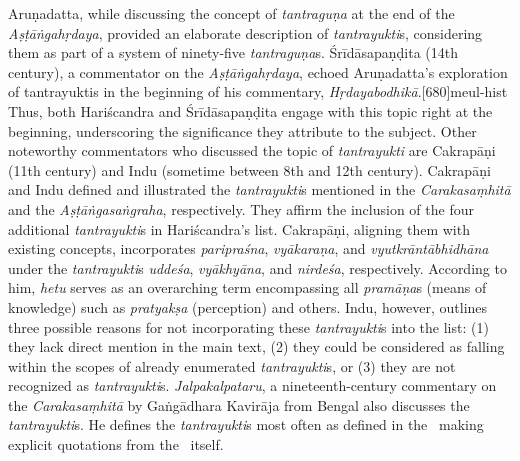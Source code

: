 Aruṇadatta, while discussing the concept of \emph{tantraguṇa} at the end of the \emph{Aṣṭāṅgahṛdaya}, provided an elaborate description of \emph{tantrayukti}s, considering them as part of a system of ninety-five \emph{tantraguṇa}s. Śrīdāsapaṇḍita (14th century), a commentator on the \emph{Aṣṭāṅgahṛdaya}, echoed Aruṇadatta's exploration of tantrayuktis in the beginning of his commentary, \emph{Hṛdayabodhikā}.[680]{meul-hist} Thus, both Hariścandra and Śrīdāsapaṇḍita engage with this topic right at the beginning, underscoring the significance they attribute to the subject. Other noteworthy commentators who discussed the topic of \emph{tantrayukti} are Cakrapāṇi (11th century) and Indu (sometime between 8th and 12th century). Cakrapāṇi and Indu defined and illustrated the \emph{tantrayukti}s mentioned in the \emph{Carakasaṃhitā} and the \emph{Aṣṭāṅgasaṅgraha}, respectively. They affirm the inclusion of the four additional \emph{tantrayukti}s in Hariścandra's list. Cakrapāṇi, aligning them with existing concepts, incorporates \emph{paripraśna}, \emph{vyākaraṇa}, and \emph{vyutkrāntābhidhāna} under the \emph{tantrayukti}s \emph{uddeśa}, \emph{vyākhyāna}, and \emph{nirdeśa}, respectively. According to him, \emph{hetu} serves as an overarching term encompassing all \emph{pramāṇa}s (means of knowledge) such as \emph{pratyakṣa} (perception) and others. Indu, however, outlines three possible reasons for not incorporating these \emph{tantrayukti}s into the list: (1) they lack direct mention in the main text, (2) they could be considered as falling within the scopes of already enumerated \emph{tantrayukti}s, or (3) they are not recognized as \emph{tantrayukti}s. \emph{Jalpakalpataru}, a nineteenth-century commentary on the \emph{Carakasaṃhitā} by Gaṅgādhara Kavirāja from Bengal also discusses the \emph{tantrayukti}s. He defines the \emph{tantrayukti}s most often as defined in the \SS\ making explicit quotations from the \SS\ itself.  

